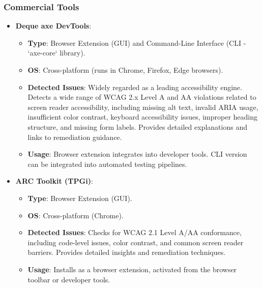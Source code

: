 \subsubsection{Commercial Tools}
\begin{itemize}
    \item \textbf{Deque axe DevTools}\cite{AxeDevTools}:
        \begin{itemize}
            \item \textbf{Type}: Browser Extension (GUI) and Command-Line Interface (CLI - `axe-core` library).
            \item \textbf{OS}: Cross-platform (runs in Chrome, Firefox, Edge browsers).
            \item \textbf{Detected Issues}: Widely regarded as a leading accessibility engine. Detects a wide range of WCAG 2.x Level A and AA violations related to screen reader accessibility, including missing alt text, invalid ARIA usage, insufficient color contrast, keyboard accessibility issues, improper heading structure, and missing form labels. Provides detailed explanations and links to remediation guidance.
            \item \textbf{Usage}: Browser extension integrates into developer tools. CLI version can be integrated into automated testing pipelines.
        \end{itemize}
    \item \textbf{ARC Toolkit (TPGi)}\cite{ARCToolkit}:
        \begin{itemize}
            \item \textbf{Type}: Browser Extension (GUI).
            \item \textbf{OS}: Cross-platform (Chrome).
            \item \textbf{Detected Issues}: Checks for WCAG 2.1 Level A/AA conformance, including code-level issues, color contrast, and common screen reader barriers. Provides detailed insights and remediation techniques.
            \item \textbf{Usage}: Installs as a browser extension, activated from the browser toolbar or developer tools.
        \end{itemize}
\end{itemize}

